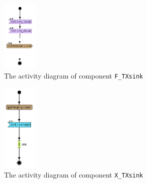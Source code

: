 \documentclass{llncs}
\begin{document}
%
\begin{figure}[!htbp]
	\centering
	\includegraphics[width=0.15\textwidth]{figures/screenshot/F_Sink.png}
	\caption{The activity diagram of component \texttt{F\_TXsink}}
	\label{fig:Fsink}
\end{figure}
%
\begin{figure}[!htbp]
	\centering
	\includegraphics[width=0.15\textwidth]{figures/screenshot/X_Sink.png}
	\caption{The activity diagram of component \texttt{X\_TXsink}}
	\label{fig:Xsink}
\end{figure}
%
%
%
\newpage
\end{document}

